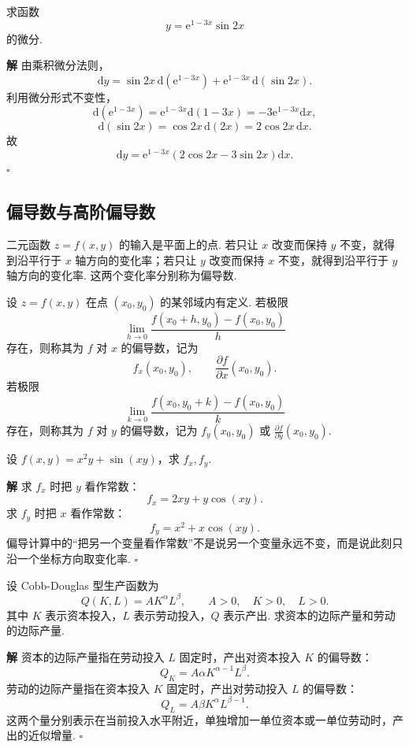 \documentclass[fontset=fandol]{ctexart}
\newenvironment{solution}{\par\noindent\textbf{解}\quad}{\hfill$\square$\par\vspace{0.8em}}
\newcommand{\dd}{\mathrm{d}}
\newcommand{\ee}{\mathrm{e}}
\begin{document}
\begin{example}[微分形式不变性]
求函数
\[
y=\ee^{1-3x}\sin2x
\]
的微分.
\end{example}
\begin{solution}
由乘积微分法则，
\[
\dd y=\sin2x\,\dd(\ee^{1-3x})+\ee^{1-3x}\,\dd(\sin2x).
\]
利用微分形式不变性，
\[
\dd(\ee^{1-3x})=\ee^{1-3x}\dd(1-3x)=-3\ee^{1-3x}\dd x,
\]
\[
\dd(\sin2x)=\cos2x\,\dd(2x)=2\cos2x\,\dd x.
\]
故
\[
\dd y=\ee^{1-3x}(2\cos2x-3\sin2x)\dd x.
\]
\end{solution}

\subsection{偏导数与高阶偏导数}

二元函数 $z=f(x,y)$ 的输入是平面上的点. 若只让 $x$ 改变而保持 $y$ 不变，就得到沿平行于 $x$ 轴方向的变化率；若只让 $y$ 改变而保持 $x$ 不变，就得到沿平行于 $y$ 轴方向的变化率. 这两个变化率分别称为偏导数.

\begin{definition}[偏导数]
设 $z=f(x,y)$ 在点 $(x_0,y_0)$ 的某邻域内有定义. 若极限
\[
\lim_{h\to0}\frac{f(x_0+h,y_0)-f(x_0,y_0)}{h}
\]
存在，则称其为 $f$ 对 $x$ 的偏导数，记为
\[
f_x(x_0,y_0),\qquad \frac{\partial f}{\partial x}(x_0,y_0).
\]
若极限
\[
\lim_{k\to0}\frac{f(x_0,y_0+k)-f(x_0,y_0)}{k}
\]
存在，则称其为 $f$ 对 $y$ 的偏导数，记为 $f_y(x_0,y_0)$ 或 $\frac{\partial f}{\partial y}(x_0,y_0)$.
\end{definition}

\begin{example}[偏导计算]
设 $f(x,y)=x^2y+\sin(xy)$，求 $f_x,f_y$.
\end{example}
\begin{solution}
求 $f_x$ 时把 $y$ 看作常数：
\[
f_x=2xy+y\cos(xy).
\]
求 $f_y$ 时把 $x$ 看作常数：
\[
f_y=x^2+x\cos(xy).
\]
偏导计算中的“把另一个变量看作常数”不是说另一个变量永远不变，而是说此刻只沿一个坐标方向取变化率.
\end{solution}

\begin{example}[边际产量]
设 Cobb-Douglas 型生产函数为
\[
Q(K,L)=A K^\alpha L^\beta,\qquad A>0,\quad K>0,\quad L>0.
\]
其中 $K$ 表示资本投入，$L$ 表示劳动投入，$Q$ 表示产出. 求资本的边际产量和劳动的边际产量.
\end{example}
\begin{solution}
资本的边际产量指在劳动投入 $L$ 固定时，产出对资本投入 $K$ 的偏导数：
\[
Q_K=A\alpha K^{\alpha-1}L^\beta.
\]
劳动的边际产量指在资本投入 $K$ 固定时，产出对劳动投入 $L$ 的偏导数：
\[
Q_L=A\beta K^\alpha L^{\beta-1}.
\]
这两个量分别表示在当前投入水平附近，单独增加一单位资本或一单位劳动时，产出的近似增量.
\end{solution}
\end{document}
